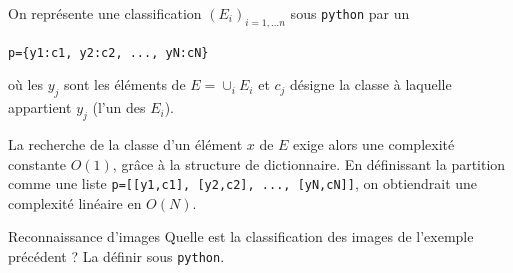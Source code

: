 \documentclass[12pt,fancy]{cours}
\begin{document}
\begin{prop}\label{prop:}
On représente une classification $(E_i)_{i=1,...n}$ sous \texttt{python} par un  
\begin{center}
\texttt{p=\{y1:c1, y2:c2, ..., yN:cN\}}
\end{center}
où les $y_j$ sont les éléments de $E=\cup_{i} E_i $ et $c_j$ désigne la classe à laquelle appartient $y_j$ (l'un des $E_i$).
\end{prop}
\begin{remarque}
    La recherche de la classe d'un élément $x$ de $E$ exige alors une complexité constante $O(1)$, grâce à la structure de dictionnaire.
    En définissant la partition comme une liste \texttt{p=[[y1,c1], [y2,c2], ..., [yN,cN]]}, on obtiendrait une complexité linéaire en $O(N)$.
\end{remarque}

\begin{exemple}{Reconnaissance d'images}
    Quelle est la classification des images de l'exemple précédent ? La définir sous \texttt{python}.
\end{exemple}
\end{document}
